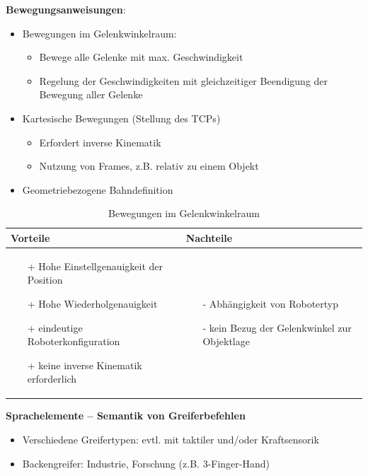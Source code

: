 \textbf{Bewegungsanweisungen}:
\begin{itemize}
\item Bewegungen im Gelenkwinkelraum:
\begin{itemize}
\item Bewege alle Gelenke mit max. Geschwindigkeit
\item Regelung der Geschwindigkeiten mit gleichzeitiger Beendigung der Bewegung aller Gelenke
\end{itemize}
\item Kartesische Bewegungen (Stellung des TCPs)
\begin{itemize}
\item Erfordert inverse Kinematik
\item Nutzung von Frames, z.B. relativ zu einem Objekt
\end{itemize}
\item Geometriebezogene Bahndefinition
\end{itemize}
\begin{table}[hbt]
\centering
\begin{tabular}{|p{7.5cm}|p{7.5cm}|}
\hline
Vorteile & Nachteile\\
\hline
\vspace{-5mm}
\begin{itemize}
\setlength\itemsep{0em}
\item[+] Hohe Einstellgenauigkeit der Position
\item[+] Hohe Wiederholgenauigkeit
\item[+] eindeutige Roboterkonfiguration
\item[+] keine inverse Kinematik erforderlich
\end{itemize}
 &
 \vspace{-5mm}
\begin{itemize}
\setlength\itemsep{0em}
\item[-] Abhängigkeit von Robotertyp
\item[-] kein Bezug der Gelenkwinkel zur Objektlage
\end{itemize}\\
\hline
\end{tabular}
\caption{Bewegungen im Gelenkwinkelraum}
\label{tab:bew}
\end{table}
\textbf{Sprachelemente -- Semantik von Greiferbefehlen}
\begin{itemize}
\item Verschiedene Greifertypen: evtl. mit taktiler und/oder Kraftsensorik
\item Backengreifer: Industrie, Forschung (z.B. 3-Finger-Hand)
\end{itemize}
